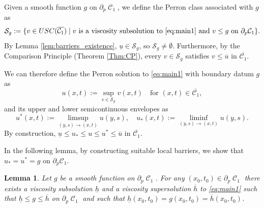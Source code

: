 \documentclass[12pt]{article}
\numberwithin{Theorem}{section}
\newtheorem{Lemma}[Theorem]{Lemma}
\theoremstyle{definition}
\theoremstyle{remark}
\numberwithin{equation}{section}
\DeclareMathOperator{\C}{\mathcal{C}}
\newcommand{\p}{\partial}
\begin{document}
Given a smooth function $g$ on $\p_p \C_1$, we define the Perron class associated with $g$ as
\begin{equation} \label{def:S_g}
    \mathcal{S}_g := \{ v \in USC(\overline{\mathcal{C}_1}) \mid v \text{ is a viscosity subsolution to \eqref{eq:main1} and } v \le g \text{ on } \partial_p \mathcal{C}_1 \}.
\end{equation}
By Lemma \ref{lem:barriers_existence}, $\underline{u} \in \mathcal{S}_g$, so $\mathcal{S}_g \neq \emptyset$. Furthermore, by the Comparison Principle (Theorem \ref{Thm:CP}), every $v \in \mathcal{S}_g$ satisfies $v \le \overline{u}$ in $\overline{\mathcal{C}_1}$.

 We can therefore define the Perron solution to \eqref{eq:main1} with boundary datum $g$  as
\[
u(x,t) := \sup_{v \in \mathcal{S}_g} v(x,t) \quad \text{for } (x,t) \in \overline{\mathcal{C}_1},
\]
and its upper and lower semicontinuous envelopes as
\[
u^*(x,t) := \limsup_{(y,s) \to (x,t)} u(y,s), \quad u_*(x,t) := \liminf_{(y,s) \to (x,t)} u(y,s).
\]
By construction, $\underline{u} \le u_* \le u \le u^* \le \overline{u}$ in $\overline{\mathcal{C}_1}$. 

In the following lemma, by constructing suitable local barriers, we show that $u_* = u^* = g$ on $\partial_p \mathcal{C}_1$.


\begin{Lemma} \label{lm:Local_barrier}
    Let $g$ be a smooth function on $\p_p \C_1$. For any $(x_0,t_0) \in \p_p \C_1$ there exists a viscosity subsolution $\underline{h}$ and a viscosity supersolution $\overline{h}$  to \eqref{eq:main1} such that $\underline{h}\leq g \leq \overline{h}$ on $\p_p \C_1$ and such that $\underline{h}(x_0,t_0)=g(x_0,t_0)=\overline{h}(x_0,t_0)$.
\end{Lemma}
\end{document}
